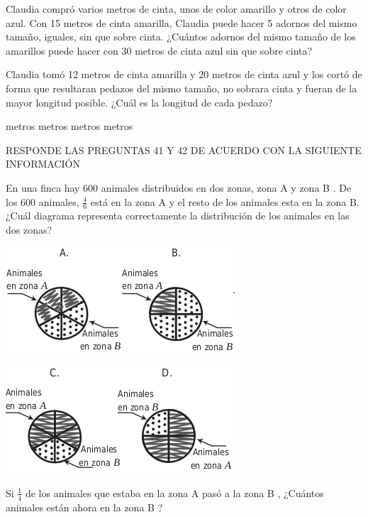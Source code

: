 \documentclass[10pt,addpoints]{exam}
\begin{document}
\begin{multicols}{2}
\begin{questions}
Claudia compró varios metros de cinta, unos de color amarillo y otros de color azul.
\question Con 15 metros de cinta amarilla, Claudia puede hacer 5 adornos del mismo tamaño, iguales, sin que sobre cinta. ¿Cuántos adornos del mismo tamaño de los amarillos puede hacer con 30 metros de cinta azul sin que sobre cinta?

\begin{oneparchoices}
\end{oneparchoices}
\question Claudia tomó 12 metros de cinta amarilla y 20 metros de cinta azul y los cortó de forma que resultaran pedazos del mismo tamaño, no sobrara cinta y fueran de la mayor longitud posible. ¿Cuál es la longitud de cada pedazo?
\begin{choices}
 metros
 metros
 metros
 metros
\end{choices}
RESPONDE LAS PREGUNTAS 41 Y 42 DE ACUERDO CON LA SIGUIENTE INFORMACIÓN

En una finca hay 600 animales distribuidos en dos zonas, zona A y zona B . De los 600 animales, $\frac{4}{6}$ está en la zona A y el resto de los animales esta en la zona B.
\question ¿Cuál diagrama representa correctamente la distribución de los animales en las dos zonas?
\begin{center}
\includegraphics[scale=.5]{Images/Pantallazo-21.png}
\end{center}
\begin{center}
\includegraphics[scale=.5]{Images/Pantallazo-22.png} 
\end{center}
\question Si $\frac{1}{4}$ de los animales que estaba en la zona A pasó a la zona B , ¿Cuántos animales están ahora en la zona B ?


\end{questions}
\end{multicols}
\end{document}
